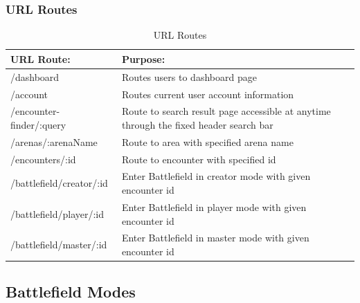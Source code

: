 \documentclass[12pt,a4paper]{report}
\begin{document}
		\subsubsection {URL Routes}
		
			\begin{table}[H]
				\begin{center}
					\begin{tabular}{ |p{5cm}|p{7cm}| } 
						\hline
						URL Route: & Purpose: \\
						\hline
						/dashboard & Routes users to dashboard page \\
						/account & Routes current user account information\\
						/encounter-finder/:query & Route to search result page accessible at anytime through the fixed header search bar  \\
						/arenas/:arenaName & Route to area with specified arena name  \\
						/encounters/:id & Route to encounter with specified id \\
						/battlefield/creator/:id & Enter Battlefield in creator mode with given encounter id \\
						/battlefield/player/:id & Enter Battlefield in player mode with given encounter id \\
						/battlefield/master/:id & Enter Battlefield in master mode with given encounter id \\	
						\hline
					\end{tabular}
				\end{center}
			\caption{URL Routes} \label{table: URL Routes}
		\end{table}
	
	\subsection{Battlefield Modes}
\end{document}
